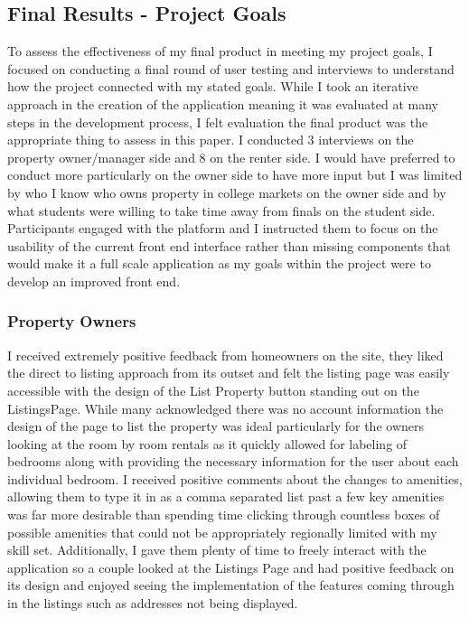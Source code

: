 \documentclass[10pt,twocolumn]{article}
\begin{document}
\subsection{Final Results - Project Goals}
To assess the effectiveness of my final product in meeting my project goals, I focused on conducting a final round of user testing and interviews to understand how the project connected with my stated goals. While I took an iterative approach in the creation of the application meaning it was evaluated at many steps in the development process, I felt evaluation the final product was the appropriate thing to assess in this paper. I conducted 3 interviews on the property owner/manager side and 8 on the renter side. I would have preferred to conduct more particularly on the owner side to have more input but I was limited by who I know who owns property in college markets on the owner side and by what students were willing to take time away from finals on the student side. Participants engaged with the platform and I instructed them to focus on the usability of the current front end interface rather than missing components that would make it a full scale application as my goals within the project were to develop an improved front end.

\subsubsection{Property Owners}
I received extremely positive feedback from homeowners on the site, they liked the direct to listing approach from its outset and felt the listing page was easily accessible with the design of the List Property button standing out on the ListingsPage. While many acknowledged there was no account information the design of the page to list the property was ideal particularly for the owners looking at the room by room rentals as it quickly allowed for labeling of bedrooms along with providing the necessary information for the user about each individual bedroom. I received positive comments about the changes to amenities, allowing them to type it in as a comma separated list past a few key amenities was far more desirable than spending time clicking through countless boxes of possible amenities that could not be appropriately regionally limited with my skill set. Additionally, I gave them plenty of time to freely interact with the application so a couple looked at the Listings Page and had positive feedback on its design and enjoyed seeing the implementation of the features coming through in the listings such as addresses not being displayed. 
\end{document}
